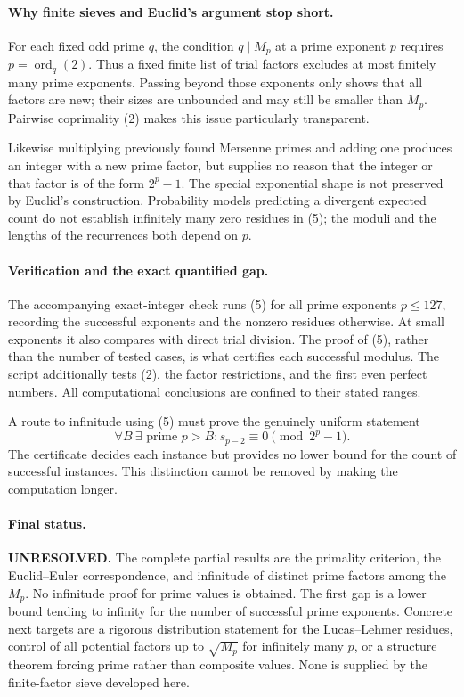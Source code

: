 \documentclass[11pt]{article}
\begin{document}
\paragraph{Why finite sieves and Euclid's argument stop short.}
For each fixed odd prime $q$, the condition $q\mid M_p$ at a prime
exponent $p$ requires $p=\operatorname{ord}_q(2)$. Thus a fixed finite
list of trial factors excludes at most finitely many prime exponents.
Passing beyond those exponents only shows that all factors are new;
their sizes are unbounded and may still be smaller than $M_p$.
Pairwise coprimality (2) makes this issue particularly transparent.

Likewise multiplying previously found Mersenne primes and adding one
produces an integer with a new prime factor, but supplies no reason
that the integer or that factor is of the form $2^p-1$.
The special exponential shape is not preserved by Euclid's construction.
Probability models predicting a divergent expected count do not
establish infinitely many zero residues in (5); the moduli and the
lengths of the recurrences both depend on $p$.

\paragraph{Verification and the exact quantified gap.}
The accompanying exact-integer check runs (5) for all prime exponents
$p\le127$, recording the successful exponents and the nonzero residues
otherwise. At small exponents it also compares with direct trial
division. The proof of (5), rather than the number of tested cases,
is what certifies each successful modulus. The script additionally
tests (2), the factor restrictions, and the first even perfect numbers.
All computational conclusions are confined to their stated ranges.

A route to infinitude using (5) must prove the genuinely uniform statement
\[
 \forall B\ \exists\text{ prime }p>B:
          s_{p-2}\equiv0\pmod{2^p-1}.
\]
The certificate decides each instance but provides no lower bound for
the count of successful instances. This distinction cannot be removed
by making the computation longer.

\paragraph{Final status.}
\textbf{UNRESOLVED.} The complete partial results are the primality
criterion, the Euclid--Euler correspondence, and infinitude of distinct
prime factors among the $M_p$. No infinitude proof for prime values is
obtained. The first gap is a lower bound tending to infinity for the
number of successful prime exponents. Concrete next targets are a
rigorous distribution statement for the Lucas--Lehmer residues, control
of all potential factors up to $\sqrt{M_p}$ for infinitely many $p$,
or a structure theorem forcing prime rather than composite values.
None is supplied by the finite-factor sieve developed here.
\end{document}
